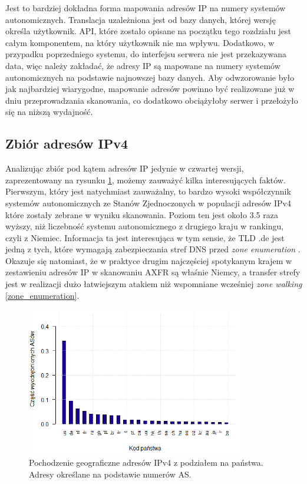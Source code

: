 Jest to bardziej dokładna forma mapowania adresów IP na numery
systemów autonomicznych. Translacja uzależniona jest od bazy danych, której wersję określa użytkownik. API, które zostało opisane
na początku tego rozdziału jest całym komponentem, na który użytkownik nie ma wpływu. Dodatkowo, w przypadku poprzedniego systemu,
do interfejsu serwera nie jest przekazywana data, więc należy zakładać, że adresy IP są mapowane na numery systemów autonomicznych
na podstawie najnowszej bazy danych. Aby odwzorowanie było jak najbardziej wiarygodne, mapowanie adresów powinno być realizowane
już w dniu przeprowadzania skanowania, co dodatkowo obciążyłoby serwer i przełożyło się na niższą wydajność.

\subsection{Zbiór adresów IPv4}
\label{sec:ipv4_results}
\noindent Analizując zbiór pod kątem adresów IP jedynie w czwartej wersji, zaprezentowany na rysunku \ref{fig:ipv4_countries}, możemy
zauważyć kilka interesujących faktów. Pierwszym, który jest natychmiast zauważalny, to bardzo wysoki współczynnik systemów autonomicznych
ze Stanów Zjednoczonych w populacji adresów IPv4 które zostały zebrane w wyniku skanowania. Poziom ten jest około 3.5 raza wyższy,
niż liczebność systemu autonomicznego z drugiego kraju w rankingu, czyli z Niemiec. Informacja ta jest interesująca w tym sensie, że
TLD .de jest jedną z tych, które wymagają zabezpieczania stref DNS przed \textit{zone enumeration} \cite{euLaw, zoneEnumeration}.
Okazuje się natomiast,
że w praktyce drugim najczęściej spotykanym krajem w zestawieniu adresów IP w skanowaniu AXFR są właśnie Niemcy, a transfer strefy
jest w realizacji dużo łatwiejszym atakiem niż wspomniane wcześniej \textit{zone walking} \ref{zone_enumeration}.

\begin{figure}[h]
	\centering
	\includegraphics[width=0.85\textwidth]{image/ipv4_as_countries_no_title}
	\caption{Pochodzenie geograficzne adresów IPv4 z podziałem na państwa. Adresy określane na podstawie numerów AS.}
	\label{fig:ipv4_countries}
\end{figure}

